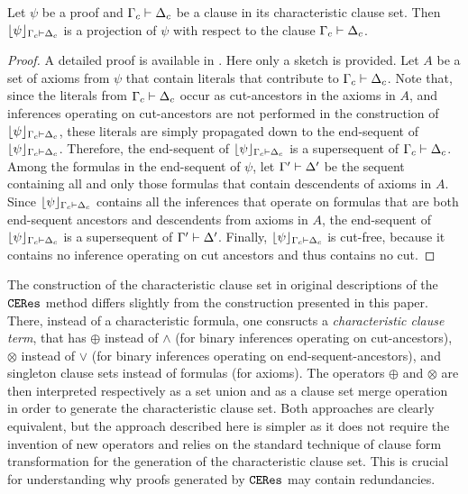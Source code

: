 \begin{theorem}
Let $\psi$ be a proof and $\Gamma_c \vdash \Delta_c$ be a clause in its characteristic clause set. Then $\lfloor \psi \rfloor_{\Gamma_c \vdash \Delta_c}$ is a projection of $\psi$ with respect to the clause $\Gamma_c \vdash \Delta_c$.
\end{theorem}
\begin{proof}
A detailed proof is available in \cite{Woltzenlogel-Paleo2009A-General-Analysis-of-Cut-Elimination-by-CERes}. Here only a sketch is provided. Let $A$ be a set of axioms from $\psi$ that contain literals that contribute to $\Gamma_c \vdash \Delta_c$. Note that, since the literals from $\Gamma_c \vdash \Delta_c$ occur as cut-ancestors in the axioms in $A$, and inferences operating on cut-ancestors are not performed in the construction of $\lfloor \psi \rfloor_{\Gamma_c \vdash \Delta_c}$, these literals are simply propagated down to the end-sequent of $\lfloor \psi \rfloor_{\Gamma_c \vdash \Delta_c}$. Therefore, the end-sequent of $\lfloor \psi \rfloor_{\Gamma_c \vdash \Delta_c}$ is a supersequent of $\Gamma_c \vdash \Delta_c$. Among the formulas in the end-sequent of $\psi$, let $\Gamma' \vdash \Delta'$ be the sequent containing all and only those formulas that contain descendents of axioms in $A$. Since $\lfloor \psi \rfloor_{\Gamma_c \vdash \Delta_c}$ contains all the inferences that operate on formulas that are both end-sequent ancestors and descendents from axioms in $A$, the end-sequent of $\lfloor \psi \rfloor_{\Gamma_c \vdash \Delta_c}$ is a supersequent of $\Gamma' \vdash \Delta'$. Finally, $\lfloor \psi \rfloor_{\Gamma_c \vdash \Delta_c}$ is cut-free, because it contains no inference operating on cut ancestors and thus contains no cut.
\hfill\QED
\end{proof}

\noindent
The construction of the characteristic clause set in original descriptions of the $\texttt{CERes}$ method \cite{BaazLeitsch1999MethodsofCut-Elimination,BaazLeitsch2000Cut-eliminationandRedundancy-eliminationbyResolution,BaazLeitsch2006Towardsaclausalanalysisofcut-elimination} differs slightly from the construction presented in this paper. There, instead of a characteristic formula, one consructs a \emph{characteristic clause term}, that has $\oplus$ instead of $\wedge$ (for binary inferences operating on cut-ancestors), $\otimes$ instead of $\vee$ (for binary inferences operating on end-sequent-ancestors), and singleton clause sets instead of formulas (for axioms). The operators $\oplus$ and $\otimes$ are then interpreted respectively as a set union and as a clause set merge operation in order to generate the characteristic clause set. Both approaches are clearly equivalent, but the approach described here is simpler as it does not require the invention of new operators and relies on the standard technique of clause form transformation for the generation of the characteristic clause set. This is crucial for understanding why proofs generated by $\texttt{CERes}$ may contain redundancies.


